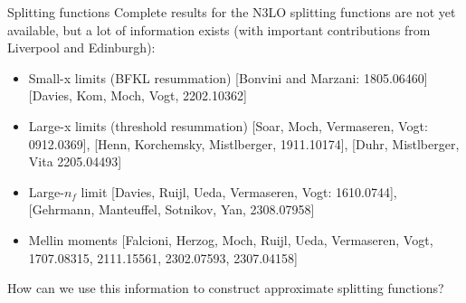 
\begin{frame}{Splitting functions}
  Complete results for the N3LO splitting functions are not yet available, but a lot of information exists (with important contributions from Liverpool and Edinburgh):
  \begin{itemize}
    \item Small-x limits (BFKL resummation) {\color{gray}\footnotesize [Bonvini and Marzani: 1805.06460] [Davies, Kom, Moch, Vogt, 2202.10362]}
    \item Large-x limits (threshold resummation) {\color{gray}\footnotesize [Soar, Moch, Vermaseren, Vogt: 0912.0369], [Henn, Korchemsky, Mistlberger, 1911.10174], [Duhr, Mistlberger, Vita 2205.04493]}
    \item Large-$n_f$ limit {\color{gray}\footnotesize [Davies, Ruijl, Ueda, Vermaseren, Vogt: 1610.0744], [Gehrmann, Manteuffel, Sotnikov, Yan, 2308.07958]}
    \item Mellin moments
    {\color{gray}\footnotesize [Falcioni, Herzog, Moch, Ruijl, Ueda, Vermaseren, Vogt, 1707.08315, 2111.15561, 2302.07593, 2307.04158]}
  \end{itemize}

  \vspace*{2em}
  \begin{center}
    How can we use this information to construct approximate splitting functions?
  \end{center}

\end{frame}


